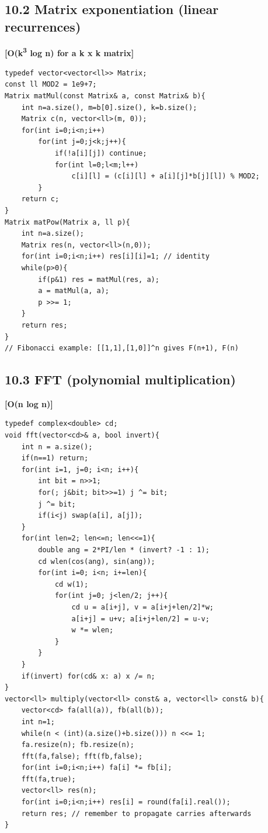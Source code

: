 \documentclass[11pt]{extarticle}
\newcommand{\comp}[1]{\textbf{[#1]}\\}
\begin{document}
\subsection*{10.2 Matrix exponentiation (linear recurrences)}
\comp{O(k\textsuperscript{3} log n) for a k x k matrix}
\begin{lstlisting}
typedef vector<vector<ll>> Matrix;
const ll MOD2 = 1e9+7;
Matrix matMul(const Matrix& a, const Matrix& b){
    int n=a.size(), m=b[0].size(), k=b.size();
    Matrix c(n, vector<ll>(m, 0));
    for(int i=0;i<n;i++)
        for(int j=0;j<k;j++){
            if(!a[i][j]) continue;
            for(int l=0;l<m;l++)
                c[i][l] = (c[i][l] + a[i][j]*b[j][l]) % MOD2;
        }
    return c;
}
Matrix matPow(Matrix a, ll p){
    int n=a.size();
    Matrix res(n, vector<ll>(n,0));
    for(int i=0;i<n;i++) res[i][i]=1; // identity
    while(p>0){
        if(p&1) res = matMul(res, a);
        a = matMul(a, a);
        p >>= 1;
    }
    return res;
}
// Fibonacci example: [[1,1],[1,0]]^n gives F(n+1), F(n)
\end{lstlisting}

\subsection*{10.3 FFT (polynomial multiplication)}
\comp{O(n log n)}
\begin{lstlisting}
typedef complex<double> cd;
void fft(vector<cd>& a, bool invert){
    int n = a.size();
    if(n==1) return;
    for(int i=1, j=0; i<n; i++){
        int bit = n>>1;
        for(; j&bit; bit>>=1) j ^= bit;
        j ^= bit;
        if(i<j) swap(a[i], a[j]);
    }
    for(int len=2; len<=n; len<<=1){
        double ang = 2*PI/len * (invert? -1 : 1);
        cd wlen(cos(ang), sin(ang));
        for(int i=0; i<n; i+=len){
            cd w(1);
            for(int j=0; j<len/2; j++){
                cd u = a[i+j], v = a[i+j+len/2]*w;
                a[i+j] = u+v; a[i+j+len/2] = u-v;
                w *= wlen;
            }
        }
    }
    if(invert) for(cd& x: a) x /= n;
}
vector<ll> multiply(vector<ll> const& a, vector<ll> const& b){
    vector<cd> fa(all(a)), fb(all(b));
    int n=1;
    while(n < (int)(a.size()+b.size())) n <<= 1;
    fa.resize(n); fb.resize(n);
    fft(fa,false); fft(fb,false);
    for(int i=0;i<n;i++) fa[i] *= fb[i];
    fft(fa,true);
    vector<ll> res(n);
    for(int i=0;i<n;i++) res[i] = round(fa[i].real());
    return res; // remember to propagate carries afterwards
}
\end{lstlisting}
\end{document}
